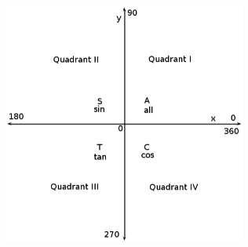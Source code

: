 	\begin{figure}[H] %
    \begin{center}
    \label{m39411*id63358!!!underscore!!!media}\label{m39411*id63358!!!underscore!!!printimage}\includegraphics[width=300px]{col11306.imgs/m39411_CAST.png} %
        
      \vspace{2pt}
    \vspace{.1in}
    
    \end{center}

 \end{figure}   

